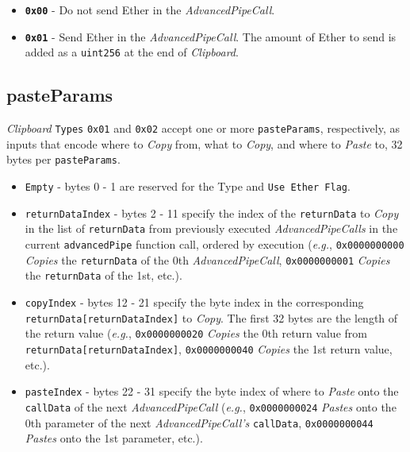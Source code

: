 \documentclass[tikz]{article}
\newcommand{\code}[1]{\texttt{#1}}
\newcommand{\term}[1]{\textsl{#1}}
\begin{document}
\begin{itemize}
    \item \textbf{\code{0x00}} - Do not send Ether in the \term{AdvancedPipeCall}.
    \item \textbf{\code{0x01}} - Send Ether in the \term{AdvancedPipeCall}. The amount of Ether to send is added as a \code{uint256} at the end of \term{Clipboard}.
\end{itemize}

\subsection{pasteParams}
\term{Clipboard} \code{Types} \code{0x01} and \code{0x02} accept one or more \code{pasteParams}, respectively, as inputs that encode where to \term{Copy} from, what to \term{Copy}, and where to \term{Paste} to, 32 bytes per \code{pasteParams}. 

\begin{itemize}
    \item \code{Empty} - bytes 0 - 1 are reserved for the Type and \code{Use Ether Flag}.
    \item \code{returnDataIndex} - bytes 2 - 11 specify the index of the \code{returnData} to \term{Copy} in the list of \code{returnData} from previously executed \term{AdvancedPipeCalls} in the current \code{advancedPipe} function call, ordered by execution (\term{e.g.}, \code{0x0000000000} \term{Copies} the \code{returnData} of the 0th \term{AdvancedPipeCall}, \code{0x0000000001} \term{Copies} the \code{returnData} of the 1st, etc.).
    \item \code{copyIndex} - bytes 12 - 21 specify the byte index in the corresponding \code{returnData[returnDataIndex]} to \term{Copy}. The first 32 bytes are the length of the return value (\term{e.g.}, \code{0x0000000020} \term{Copies} the 0th return value from \code{returnData[returnDataIndex]}, \code{0x0000000040} \term{Copies} the 1st return value, etc.).
    \item \code{pasteIndex} - bytes 22 - 31 specify the byte index of where to \term{Paste} onto the \code{callData} of the next \term{AdvancedPipeCall} (\term{e.g.}, \code{0x0000000024} \term{Pastes} onto the 0th parameter of the next \term{AdvancedPipeCall's} \code{callData}, \code{0x0000000044} \term{Pastes} onto the 1st parameter, etc.). 
\end{itemize}

\newpage
\end{document}
